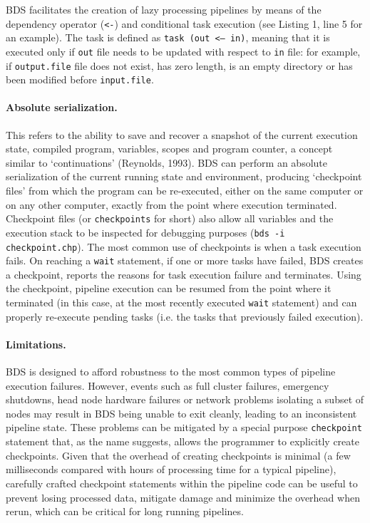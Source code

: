 BDS facilitates the creation of lazy processing pipelines by means of the dependency operator (\texttt{<-}) and conditional task execution (see Listing 1, line 5 for an example). The task is defined as \texttt{task (out <– in)}, meaning that it is executed only if \texttt{out} file needs to be updated with respect to \texttt{in} file: for example, if \texttt{output.file} file does not exist, has zero length, is an empty directory or has been modified before \texttt{input.file}.

\paragraph{Absolute serialization.} This refers to the ability to save and recover a snapshot of the current execution state, compiled program, variables, scopes and program counter, a concept similar to ‘continuations’ (Reynolds, 1993). BDS can perform an absolute serialization of the current running state and environment, producing ‘checkpoint files’ from which the program can be re-executed, either on the same computer or on any other computer, exactly from the point where execution terminated. Checkpoint files (or \texttt{checkpoints} for short) also allow all variables and the execution stack to be inspected for debugging purposes (\texttt{bds -i checkpoint.chp}). The most common use of checkpoints is when a task execution fails. On reaching a \texttt{wait} statement, if one or more tasks have failed, BDS creates a checkpoint, reports the reasons for task execution failure and terminates. Using the checkpoint, pipeline execution can be resumed from the point where it terminated (in this case, at the most recently executed \texttt{wait} statement) and can properly re-execute pending tasks (i.e. the tasks that previously failed execution).

\paragraph{Limitations.} BDS is designed to afford robustness to the most common types of pipeline execution failures. However, events such as full cluster failures, emergency shutdowns, head node hardware failures or network problems isolating a subset of nodes may result in BDS being unable to exit cleanly, leading to an inconsistent pipeline state. These problems can be mitigated by a special purpose \texttt{checkpoint} statement that, as the name suggests, allows the programmer to explicitly create checkpoints. Given that the overhead of creating checkpoints is minimal (a few milliseconds compared with hours of processing time for a typical pipeline), carefully crafted checkpoint statements within the pipeline code can be useful to prevent losing processed data, mitigate damage and minimize the overhead when rerun, which can be critical for long running pipelines.

